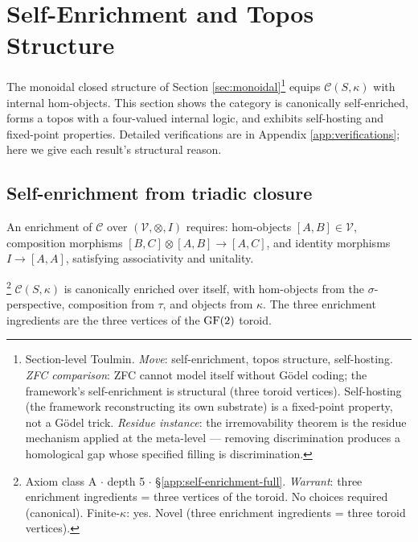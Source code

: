 \section{Self-Enrichment and Topos Structure}\label{sec:topos}

The monoidal closed structure of Section \ref{sec:monoidal}\footnote{Section-level Toulmin. \emph{Move}: self-enrichment, topos structure, self-hosting. \emph{ZFC comparison}: ZFC cannot model itself without G\"{o}del coding; the framework's self-enrichment is structural (three toroid vertices). Self-hosting (the framework reconstructing its own substrate) is a fixed-point property, not a G\"{o}del trick. \emph{Residue instance}: the irremovability theorem is the residue mechanism applied at the meta-level --- removing discrimination produces a homological gap whose specified filling is discrimination.}
equips $\mathcal{C}(S,\kappa)$ with internal hom-objects.
This section shows the category is canonically self-enriched,
forms a topos with a four-valued internal logic, and
exhibits self-hosting and fixed-point properties. Detailed
verifications are in Appendix \ref{app:verifications}; here
we give each result's structural reason.

\subsection{Self-enrichment from triadic closure}

\begin{definition}\label{def:enrichment-data}
An enrichment of $\mathcal{C}$ over $(\mathcal{V}, \otimes, I)$
requires: hom-objects $[A,B] \in \mathcal{V}$, composition
morphisms $[B,C] \otimes [A,B] \to [A,C]$, and identity
morphisms $I \to [A,A]$, satisfying associativity and
unitality.
\end{definition}

\begin{theorem}\label{thm:self-enrich}\footnote{Axiom class \textsf{A} $\cdot$ depth 5 $\cdot$ \S\ref{app:self-enrichment-full}.  \emph{Warrant}: three enrichment ingredients = three vertices of the toroid. No choices required (canonical). Finite-$\kappa$: yes. Novel (three enrichment ingredients = three toroid vertices).}
$\mathcal{C}(S,\kappa)$ is canonically enriched over itself,
with hom-objects from the $\sigma$-perspective, composition
from $\tau$, and objects from $\kappa$. The three enrichment
ingredients are the three vertices of the $\operatorname{GF}(2)$ toroid.
\end{theorem}

